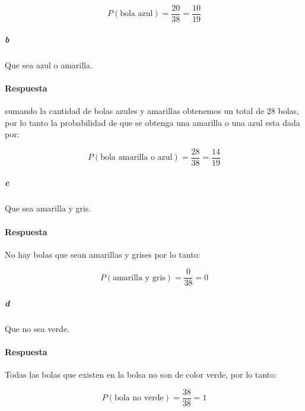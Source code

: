 \documentclass{article}
\begin{document}
$$P(\text{bola azul}) = \frac{20}{38} = \frac{10}{19}$$

\subparagraph{b} Que sea azul o amarilla.

\paragraph{Respuesta} sumando la cantidad de bolas azules y amarillas obtenemos un total de $28$ bolas, por lo tanto la probabilidad de que se obtenga una amarilla o una azul esta dada por:

$$P(\text{bola amarilla o azul}) = \frac{28}{38} = \frac{14}{19}$$

\subparagraph{c} Que sea amarilla y gris.

\paragraph{Respuesta} No hay bolas que sean amarillas y grises por lo tanto:

$$P(\text{amarilla y gris}) = \frac{0}{38} = 0$$

\subparagraph{d} Que no sea verde.

\paragraph{Respuesta} Todas las bolas que existen en la bolsa no son de color verde, por lo tanto:

$$P(\text{bola no verde}) = \frac{38}{38} = 1$$

	
\end{document}

